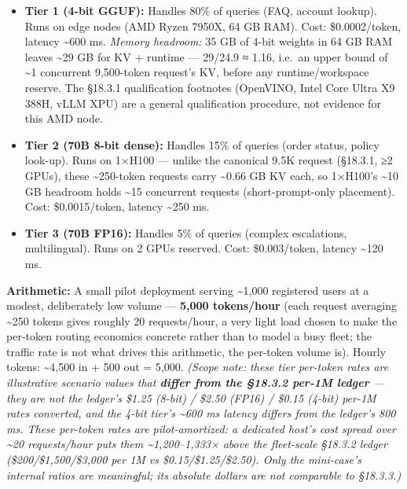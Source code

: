 \begin{itemize}
\tightlist
\item
  \textbf{Tier 1 (4-bit GGUF):} Handles 80\% of queries (FAQ, account
  lookup). Runs on edge nodes (AMD Ryzen 7950X, 64 GB RAM). Cost:
  \$0.0002/token, latency \textasciitilde600 ms. \emph{Memory headroom:}
  35 GB of 4-bit weights in 64 GB RAM leaves \textasciitilde29 GB for KV
  + runtime --- 29/24.9 ≈ 1.16, i.e.~an upper bound of \textasciitilde1
  concurrent 9,500-token request's KV, before any runtime/workspace
  reserve. The §18.3.1 qualification footnotes (OpenVINO, Intel Core
  Ultra X9 388H, vLLM XPU) are a general qualification procedure, not
  evidence for this AMD node.
\item
  \textbf{Tier 2 (70B 8-bit dense):} Handles 15\% of queries (order
  status, policy look-up). Runs on 1×H100 --- unlike the canonical 9.5K
  request (§18.3.1, ≥2 GPUs), these \textasciitilde250-token requests
  carry \textasciitilde0.66 GB KV each, so 1×H100's \textasciitilde10 GB
  headroom holds \textasciitilde15 concurrent requests
  (short-prompt-only placement). Cost: \$0.0015/token, latency
  \textasciitilde250 ms.
\item
  \textbf{Tier 3 (70B FP16):} Handles 5\% of queries (complex
  escalations, multilingual). Runs on 2 GPUs reserved. Cost:
  \$0.003/token, latency \textasciitilde120 ms.
\end{itemize}

\textbf{Arithmetic:} A small pilot deployment serving
\textasciitilde1,000 registered users at a modest, deliberately low
volume --- \textbf{5,000 tokens/hour} (each request averaging
\textasciitilde250 tokens gives roughly 20 requests/hour, a very light
load chosen to make the per-token routing economics concrete rather than
to model a busy fleet; the traffic rate is not what drives this
arithmetic, the per-token volume is). Hourly tokens:
\textasciitilde4,500 in + 500 out = 5,000. \emph{(Scope note: these tier
per-token rates are illustrative scenario values that \textbf{differ
from the §18.3.2 per-1M ledger} --- they are not the ledger's \$1.25
(8-bit) / \$2.50 (FP16) / \$0.15 (4-bit) per-1M rates converted, and the
4-bit tier's \textasciitilde600 ms latency differs from the ledger's 800
ms. These per-token rates are pilot-amortized: a dedicated host's cost
spread over \textasciitilde20 requests/hour puts them
\textasciitilde1,200--1,333× above the fleet-scale §18.3.2 ledger
(\$200/\$1,500/\$3,000 per 1M vs \$0.15/\$1.25/\$2.50). Only the
mini-case's internal ratios are meaningful; its absolute dollars are not
comparable to §18.3.3.)}

